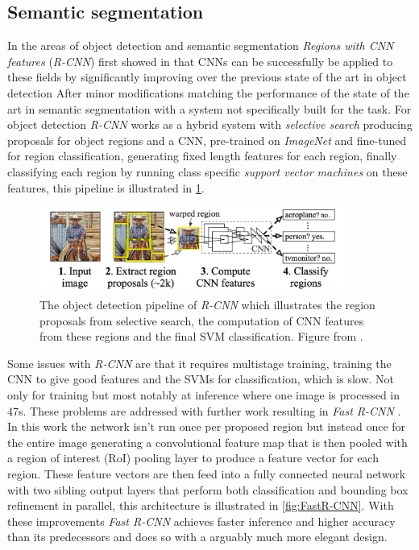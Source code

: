 \documentclass{kththesis}
\newcommand{\bibentry}[1]{\parencite{#1}}
\begin{document}
\subsection{Semantic segmentation}
In the areas of object detection and semantic segmentation \emph{Regions
  with CNN features} (\emph{R-CNN}) \bibentry{girshick2014rich} 
first showed in that CNNs can be successfully be applied to these fields by
significantly improving over the previous state of the art in object detection
\bibentry{ren2013histograms} After minor modifications matching the
performance of the state of the art in semantic segmentation
\bibentry{carreira2012semantic} with a system not specifically built for the
task. For object detection \emph{R-CNN} works as a hybrid system with
\emph{selective search} \bibentry{uijlings2013selective} producing proposals for
object regions and a CNN, pre-trained on \emph{ImageNet}
\bibentry{deng2009imagenet} and fine-tuned for region classification, generating
fixed length features for each region, finally classifying each region by
running class specific \emph{support vector machines}
\bibentry{boser1992training} on these features, this pipeline is illustrated in \cref{fig:R-CNN}.

\begin{figure}[h]
  \centering
  \includegraphics[width=0.9\textwidth]{R-CNN}
  \caption{The object detection pipeline of \textit{R-CNN} which illustrates the
  region proposals from selective search, the computation of CNN features from
  these regions and the final SVM classification. Figure from \textcite{girshick2014rich}.}
  \label{fig:R-CNN}
  \end{figure}

Some issues with \emph{R-CNN}
are that it requires multistage training, training the CNN to give good
features and the SVMs for classification, which is slow. Not only for training
but most notably at inference where one image is processed in 47s.
These problems are addressed with further work resulting in \emph{Fast R-CNN}
\bibentry{girshick2015fast}. In this work the network isn't run once per proposed region but
instead once for the entire image generating a convolutional feature map that
is then pooled with a region of interest (RoI) pooling layer to produce a
feature vector for each region. These feature vectors are then feed into a fully
connected neural network with two sibling output layers that perform both
classification and bounding box refinement in parallel, this architecture is
illustrated in \cref{fig:FastR-CNN}. With these improvements
\emph{Fast R-CNN} achieves faster inference and higher accuracy than its
predecessors and does so with a arguably much more elegant design.
\end{document}
